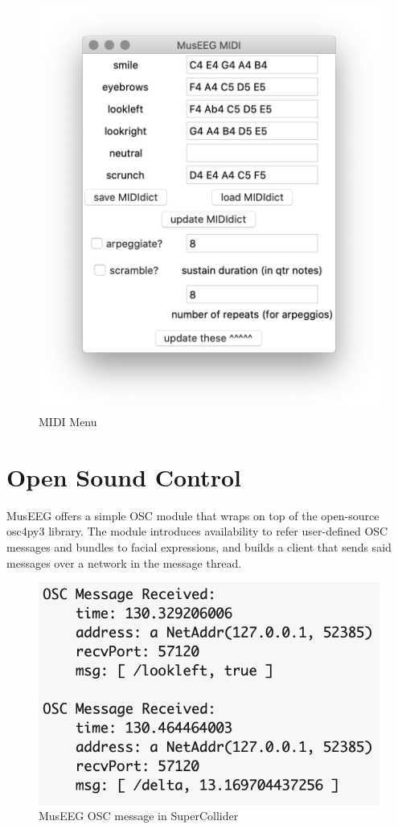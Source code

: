 \begin{figure}[H]
	\centering
		\includegraphics[width=0.6\columnwidth]{midi-menu.png}
	\caption{MIDI Menu}
	\label{fig:midi-menu}
\end{figure} 

\pagebreak

\section{Open Sound Control}
MusEEG offers a simple OSC module that wraps on top of the open-source osc4py3 library. The module introduces availability to refer user-defined OSC messages and bundles to facial expressions, and builds a client that sends said messages over a network in the message thread. 

 \begin{figure}[htbp!]
	\centering
		\includegraphics[width=0.7\columnwidth]{OSCmsg.png}
	\caption{MusEEG OSC message in SuperCollider}
	\label{fig:oscmsg}
\end{figure} 